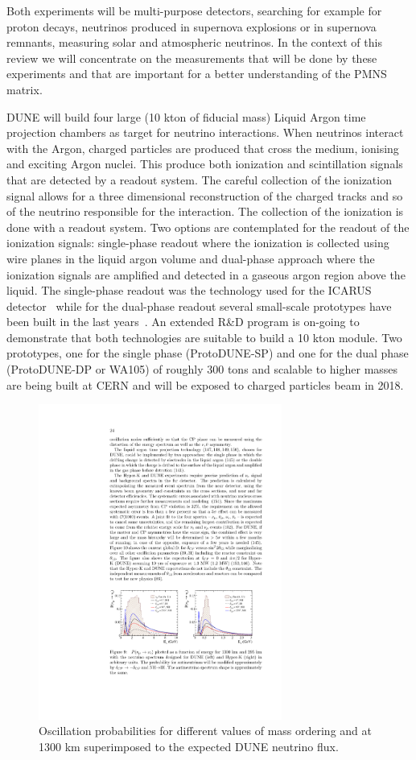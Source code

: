 Both experiments will be multi-purpose detectors, searching for example for proton decays, neutrinos produced in supernova explosions or in supernova remnants, measuring solar and atmospheric neutrinos. In the context of this review we will concentrate on the measurements that will be done by these experiments and that are important for a better understanding of the PMNS matrix.

DUNE will build four large (10 kton of fiducial mass) Liquid Argon time projection chambers as target for neutrino interactions. When neutrinos interact with the Argon, charged particles are produced that cross the medium, ionising and exciting Argon nuclei. This produce both ionization and scintillation signals that are detected by a readout system. The careful collection of the ionization signal allows for a three dimensional reconstruction of the charged tracks and so of the neutrino responsible for the interaction. The collection of the ionization is done with a readout system. Two options are contemplated for the readout of the ionization signals: single-phase readout where the ionization is collected using wire planes in the liquid argon volume and dual-phase approach where the ionization signals are amplified and detected in a gaseous argon region above the liquid. The single-phase readout was the technology used for the ICARUS detector~\cite{icarus} while for the dual-phase readout several small-scale prototypes have been built in the last years~\cite{}. An extended R\&D program is on-going to demonstrate that both technologies are suitable to build a 10 kton module. Two prototypes, one for the single phase (ProtoDUNE-SP) and one for the dual phase (ProtoDUNE-DP or WA105) of roughly 300 tons and scalable to higher masses are being built at CERN and will be exposed to charged particles beam in 2018.  

\begin{figure} [htbp!]
\begin{center}
\includegraphics[width=8cm]{figures/dune_flux.pdf}
\caption{\label{fig:duneflux} Oscillation probabilities for different values of mass ordering and \dcp at 1300 km superimposed to the expected DUNE neutrino flux.}
\end{center}
\end{figure}


